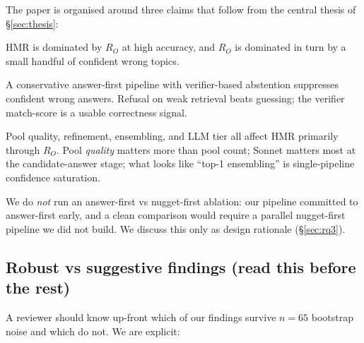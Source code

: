 \documentclass[11pt,a4paper]{article}
\begin{document}
The paper is organised around three claims that follow from the central
thesis of \S\ref{sec:thesis}:

\begin{description}[style=nextline,leftmargin=1.5em]
  \item[\textbf{Claim 1 — Metric / operating point}
    (\S\ref{sec:rq1}, \S\ref{sec:hmr_diagnostics},
    \S\ref{sec:ro_bottleneck}).]
    HMR is dominated by $R_O$ at high accuracy, and $R_O$ is dominated
    in turn by a small handful of confident wrong topics.
  \item[\textbf{Claim 2 — System design}
    (\S\ref{sec:pipeline}, \S\ref{sec:rq4}, \S\ref{sec:rq5},
    \S\ref{sec:rq7}).]
    A conservative answer-first pipeline with verifier-based abstention
    suppresses confident wrong answers. Refusal on weak retrieval beats
    guessing; the verifier match-score is a usable correctness signal.
  \item[\textbf{Claim 3 — Engineering tradeoffs}
    (\S\ref{sec:rq2}, \S\ref{sec:rq6}, \S\ref{sec:rq8},
    \S\ref{sec:rq9}, \S\ref{sec:rq10}).]
    Pool quality, refinement, ensembling, and LLM tier all affect HMR
    primarily through $R_O$. Pool \emph{quality} matters more than pool
    count; Sonnet matters most at the candidate-answer stage; what
    looks like ``top-1 ensembling'' is single-pipeline confidence
    saturation.
\end{description}

\noindent We do \emph{not} run an answer-first vs nugget-first
ablation: our pipeline committed to answer-first early, and a clean
comparison would require a parallel nugget-first pipeline we did not
build. We discuss this only as design rationale (\S\ref{sec:rq3}).

\subsection{Robust vs suggestive findings (read this before the rest)}\label{sec:robust_vs_suggestive}

A reviewer should know up-front which of our findings survive
$n=65$ bootstrap noise and which do not. We are explicit:
\end{document}
